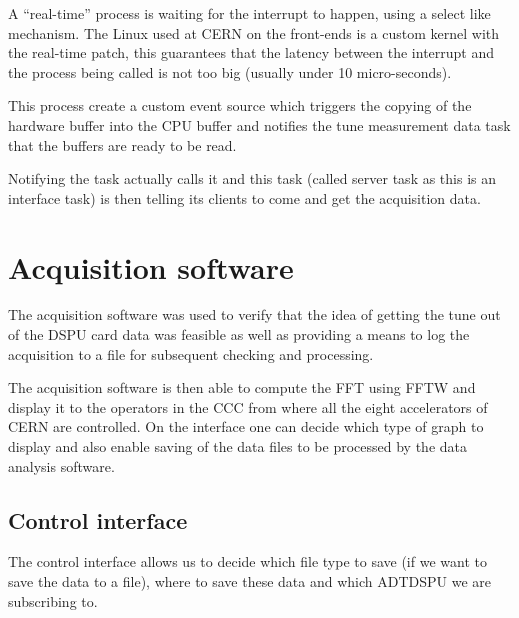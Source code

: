 A ``real-time'' process is waiting for the interrupt to happen, using a select like mechanism. The Linux used at \gls{CERN} on the front-ends is a custom kernel with the real-time patch, this guarantees that the latency between the interrupt and the process being called is not too big (usually under 10 micro-seconds).

This process create a custom event source which triggers the copying of the hardware buffer into the \gls{CPU} buffer and notifies the tune measurement data task that the buffers are ready to be read.

Notifying the task actually calls it and this task (called server task as this is an interface task) is then telling its clients to come and get the acquisition data. 

\section{Acquisition software}

The acquisition software was used to verify that the idea of getting the tune out of the DSPU card data was feasible as well as providing a means to log the acquisition to a file for subsequent checking and processing.

The acquisition software is then able to compute the \gls{FFT} using \gls{FFTW} and display it to the operators in the \gls{CCC} from where all the eight accelerators of \gls{CERN} are controlled. On the interface one can decide which type of graph to display and also enable saving of the data files to be processed by the data analysis software.

\subsection{Control interface}

The control interface allows us to decide which file type to save (if we want to save the data to a file), where to save these data and which ADTDSPU we are subscribing to.

